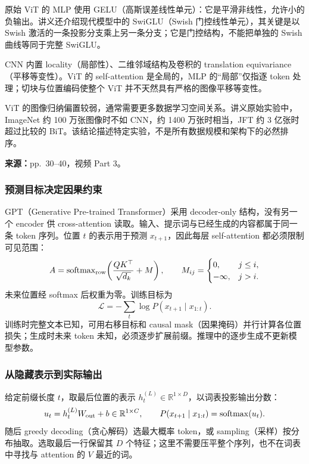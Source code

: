 原始 ViT 的 MLP 使用 GELU（高斯误差线性单元）：它是平滑非线性，允许小的负输出。讲义还介绍现代模型中的 SwiGLU（Swish 门控线性单元），其关键是以 Swish 激活的一条投影分支乘上另一条分支；它是门控结构，不能把单独的 Swish 曲线等同于完整 SwiGLU。

CNN 内置 locality（局部性）、二维邻域结构及卷积的 translation equivariance（平移等变性）。ViT 的 self-attention 是全局的，MLP 的“局部”仅指逐 token 处理；切块与位置编码使整个 ViT 并不天然具有严格的图像平移等变性。

ViT 的图像归纳偏置较弱，通常需要更多数据学习空间关系。讲义原始实验中，ImageNet 约 100 万张图像时不如 CNN，约 1400 万张时相当，JFT 约 3 亿张时超过比较的 BiT。该结论描述特定实验，不是所有数据规模和架构下的必然排序。


\textbf{来源：}pp.~30--40，视频 Part 3。

\subsubsection{预测目标决定因果约束}

GPT（Generative Pre-trained Transformer）采用 decoder-only 结构，没有另一个 encoder 供 cross-attention 读取。输入、提示词与已经生成的内容都属于同一条 token 序列。位置 $t$ 的表示用于预测 $x_{t+1}$，因此每层 self-attention 都必须限制可见范围：
\[
 A=\operatorname{softmax}_{\rm row}\!\left(\frac{QK^\top}{\sqrt{d_k}}+M\right),
 \qquad M_{ij}=\begin{cases}0,&j\le i,\\-\infty,&j>i.\end{cases}
\]
未来位置经 softmax 后权重为零。训练目标为
\[
 \mathcal L=-\sum_t\log P(x_{t+1}\mid x_{1:t}).
\]
训练时完整文本已知，可用右移目标和 causal mask（因果掩码）并行计算各位置损失；生成时未来 token 未知，必须逐步扩展前缀。推理中的逐步生成不更新模型参数。

\subsubsection{从隐藏表示到实际输出}

给定前缀长度 $t$，取最后位置的表示 $h_t^{(L)}\in\mathbb R^{1\times D}$，以词表投影输出分数：
\[
 u_t=h_t^{(L)}W_{\rm out}+b\in\mathbb R^{1\times C},\qquad
 P(x_{t+1}\mid x_{1:t})=\operatorname{softmax}(u_t).
\]
随后 greedy decoding（贪心解码）选最大概率 token，或 sampling（采样）按分布抽取。选取最后一行保留其 $D$ 个特征；这里不需要压平整个序列，也不在词表中寻找与 attention 的 $V$ 最近的词。

